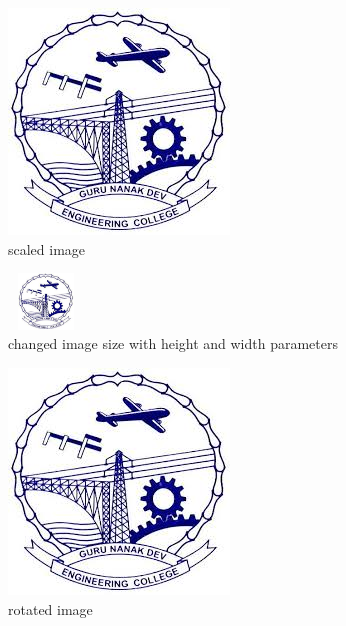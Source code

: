 \documentclass{article}
\begin{document}
		\begin{figure}
		\centering
		\includegraphics[scale=2]{../../images/gnelogo}
		\caption{scaled image}
		\label{fig:logo}
		\end{figure}
		\begin{figure}
			\centering
			\includegraphics[width=2cm, height=1.5cm]{../../images/gnelogo}
			\caption{changed image size with height and width parameters}
			\label{fig:logo}
		\end{figure}
		\begin{figure}
			\centering
			\includegraphics[scale=1.2,angle=45]{../../images/gnelogo}
			\caption{rotated image}
			\label{fig:logo}
			
		\end{figure}

	
\end{document}
